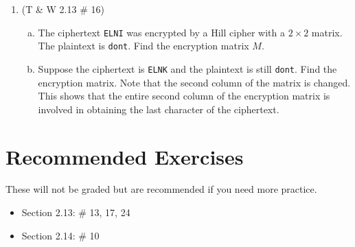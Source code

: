 \documentclass[12pt]{amsart}
\theoremstyle{plain}
\theoremstyle{definition}
\begin{document}
\begin{enumerate}[1.]
	\begin{framed}
	\vspace{2in}
	\end{framed}
		\item (T \& W 2.13 \# 16)
		\begin{enumerate}[a.]
		\item The ciphertext \texttt{ELNI} was encrypted by a Hill cipher with a $2 \times 2$ matrix.  The plaintext is \texttt{dont}.  Find the encryption matrix $M$.
		\begin{framed}
		\vspace{1.5in}
		\end{framed}
		\item Suppose the ciphertext is \texttt{ELNK} and the plaintext is still \texttt{dont}.  Find the encryption matrix.  Note that the second column of the matrix is changed.  This shows that the entire second column of the encryption matrix is involved in obtaining the last character of the ciphertext.
		\begin{framed}
		\vspace{2.5in}
		\end{framed}
		\end{enumerate}

\end{enumerate}

\section{Recommended Exercises}
\noindent These will not be graded but are recommended if you need more practice.
\begin{itemize}
	\item Section 2.13: \# 13, 17, 24
	\item Section 2.14: \# 10
\end{itemize}
	
\end{document}

